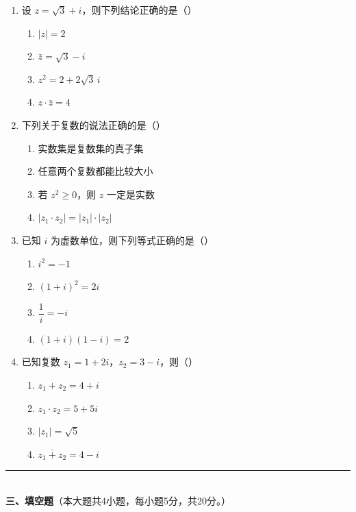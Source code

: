\documentclass[12pt, a4paper]{ctexart}
\begin{document}
\begin{enumerate}[resume]
\item 设 $z=\sqrt{3}+i$，则下列结论正确的是（\quad）
  \begin{enumerate}[label=\Alph*., itemsep=0pt]
    \item $|z|=2$
    \item $\bar{z}=\sqrt{3}-i$
    \item $z^2=2+2\sqrt{3}\,i$
    \item $z\cdot\bar{z}=4$
  \end{enumerate}

\item 下列关于复数的说法正确的是（\quad）
  \begin{enumerate}[label=\Alph*., itemsep=0pt]
    \item 实数集是复数集的真子集
    \item 任意两个复数都能比较大小
    \item 若 $z^2\geqslant 0$，则 $z$ 一定是实数
    \item $|z_1\cdot z_2|=|z_1|\cdot|z_2|$
  \end{enumerate}

\item 已知 $i$ 为虚数单位，则下列等式正确的是（\quad）
  \begin{enumerate}[label=\Alph*., itemsep=0pt]
    \item $i^2=-1$
    \item $(1+i)^2=2i$
    \item $\dfrac{1}{i}=-i$
    \item $(1+i)(1-i)=2$
  \end{enumerate}

\item 已知复数 $z_1=1+2i$，$z_2=3-i$，则（\quad）
  \begin{enumerate}[label=\Alph*., itemsep=0pt]
    \item $z_1+z_2=4+i$
    \item $z_1\cdot z_2=5+5i$
    \item $|z_1|=\sqrt{5}$
    \item $\overline{z_1+z_2}=4-i$
  \end{enumerate}
\end{enumerate}

\vspace{6pt}

\noindent\rule{\textwidth}{0.4pt}\\[2pt]
{\large\bfseries 三、填空题}（本大题共4小题，每小题5分，共20分。）
\end{document}
